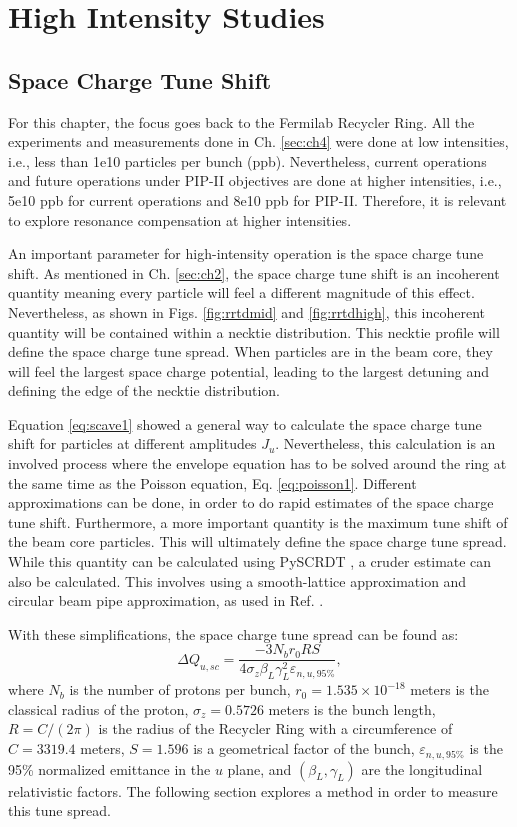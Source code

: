 \chapter{High Intensity Studies}
\label{sec:ch6}

\section{Space Charge Tune Shift}

For this chapter, the focus goes back to the Fermilab Recycler Ring. All the experiments and measurements done in Ch. \ref{sec:ch4} were done at low intensities, i.e., less than 1e10 particles per bunch (ppb). Nevertheless, current operations and future operations under PIP-II objectives are done at higher intensities, i.e., 5e10 ppb for current operations and 8e10 ppb for PIP-II. Therefore, it is relevant to explore resonance compensation at higher intensities. 

An important parameter for high-intensity operation is the space charge tune shift. As mentioned in Ch. \ref{sec:ch2}, the space charge tune shift is an incoherent quantity meaning every particle will feel a different magnitude of this effect. Nevertheless, as shown in Figs. \ref{fig:rrtdmid} and \ref{fig:rrtdhigh}, this incoherent quantity will be contained within a necktie distribution. This necktie profile will define the space charge tune spread. When particles are in the beam core, they will feel the largest space charge potential, leading to the largest detuning and defining the edge of the necktie distribution.

Equation \ref{eq:scave1} showed a general way to calculate the space charge tune shift for particles at different amplitudes $J_u$. Nevertheless, this calculation is an involved process where the envelope equation has to be solved around the ring at the same time as the Poisson equation, Eq. \ref{eq:poisson1}. Different approximations can be done, in order to do rapid estimates of the space charge tune shift. Furthermore, a more important quantity is the maximum tune shift of the beam core particles. This will ultimately define the space charge tune spread. While this quantity can be calculated using PySCRDT \cite{scrdt_report}, a cruder estimate can also be calculated. This involves using a smooth-lattice approximation and circular beam pipe approximation, as used in Ref. \cite{zhang}. 

With these simplifications, the space charge tune spread can be found as:
\begin{equation}
    \label{eq:tunesc}
    \Delta Q_{u,sc}=\frac{-3 N_b r_0 R S}{4 \sigma_z \beta_L \gamma_L ^2 \varepsilon_{n,u,95\%}},    
\end{equation}
where $N_b$ is the number of protons per bunch, $r_0=1.535\times 10^{-18}$ meters is the classical radius of the proton, $\sigma_z = 0.5726$ meters is the bunch length, $R = C/(2 \pi)$ is the radius of the Recycler Ring with a circumference of $C=3319.4$ meters, $S=1.596$ is a geometrical factor of the bunch, $\varepsilon_{n,u,95\%}$ is the 95\% normalized emittance in the $u$ plane, and $(\beta_L,\gamma_L)$ are the longitudinal relativistic factors. The following section explores a method in order to measure this tune spread.  

